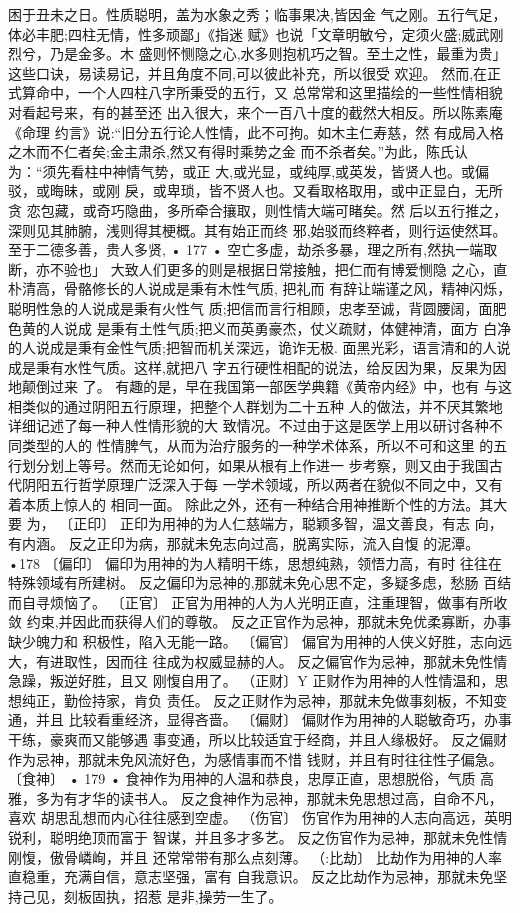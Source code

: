 困于丑未之日。性质聪明，盖为水象之秀；临事果决,皆因金
气之刚。五行气足，体必丰肥;四柱无情，性多顽鄙」《指迷
赋》也说「文章明敏兮，定须火盛;威武刚烈兮，乃是金多。木
盛则怀恻隐之心,水多则抱机巧之智。至土之性，最重为贵」
这些口诀，易读易记，并且角度不同,可以彼此补充，所以很受
欢迎。
然而,在正式算命中，一个人四柱八字所秉受的五行，又
总常常和这里描绘的一些性情相貌对看起号来，有的甚至还
出入很大，来个一百八十度的截然大相反。所以陈素庵《命理
约言》说:“旧分五行论人性情，此不可拘。如木主仁寿慈，然
有成局入格之木而不仁者矣;金主肃杀,然又有得时乘势之金
而不杀者矣。”为此，陈氏认为：“须先看柱中神情气势，或正
大,或光显，或纯厚,或英发，皆贤人也。或偏驳，或晦昧，或刚
戾，或卑琐，皆不贤人也。又看取格取用，或中正显白，无所贪
恋包藏，或奇巧隐曲，多所牵合攘取，则性情大端可睹矣。然
后以五行推之，深则见其肺腑，浅则得其梗概。其有始正而终
邪,始驳而终粹者，则行运使然耳。至于二德多善，贵人多贤,
• 177 •
空亡多虚，劫杀多暴，理之所有,然执一端取断，亦不验也」
大致人们更多的则是根据日常接触，把仁而有博爱恻隐
之心，直朴清高，骨骼修长的人说成是秉有木性气质, 把礼而
有辞让端谨之风，精神闪烁，聪明性急的人说成是秉有火性气
质;把信而言行相顾，忠孝至诚，背圆腰阔，面肥色黄的人说成
是秉有土性气质;把义而英勇豪杰，仗义疏财，体健神清，面方
白净的人说成是秉有金性气质;把智而机关深远，诡诈无极.
面黑光彩，语言清和的人说成是秉有水性气质。这样,就把八
字五行硬性相配的说法，给反因为果，反果为因地颠倒过来
了。
有趣的是，早在我国第一部医学典籍《黄帝内经》中，也有
与这相类似的通过阴阳五行原理，把整个人群划为二十五种
人的做法，并不厌其繁地详细记述了每一种人性情形貌的大
致情况。不过由于这是医学上用以研讨各种不同类型的人的
性情脾气，从而为治疗服务的一种学术体系，所以不可和这里
的五行划分划上等号。然而无论如何，如果从根有上作进一
步考察，则又由于我国古代阴阳五行哲学原理广泛深入于每
一学术领域，所以两者在貌似不同之中，又有着本质上惊人的
相同一面。
除此之外，还有一种结合用神推断个性的方法。其大要
为，
〔正印〕
正印为用神的为人仁慈端方，聪颖多智，温文善良，有志
向，有内涵。
反之正印为病，那就未免志向过高，脱离实际，流入自愎
的泥潭。
•178
〔偏印〕
偏印为用神的为人精明干练，思想纯熟，领悟力高，有时
往往在特殊领域有所建树。
反之偏印为忌神的,那就未免心思不定，多疑多虑，愁肠
百结而自寻烦恼了。
〔正官〕
正官为用神的人为人光明正直，注重理智，做事有所收敛
约束,并因此而获得人们的尊敬。
反之正官作为忌神，那就未免优柔寡断，办事缺少魄力和
积极性，陷入无能一路。
〔偏官〕
偏官为用神的人侠义好胜，志向远大，有进取性，因而往
往成为权威显赫的人。
反之偏官作为忌神，那就未免性情急躁，叛逆好胜，且又
刚愎自用了。
（正财〕Y
正财作为用神的人性情温和，思想纯正，勤俭持家，肯负
责任。
反之正财作为忌神，那就未免做事刻板，不知变通，并且
比较看重经济，显得吝啬。
〔偏财〕
偏财作为用神的人聪敏奇巧，办事干练，豪爽而又能够遇
事变通，所以比较适宜于经商，并且人缘极好。
反之偏财作为忌神，那就未免风流好色，为感情事而不惜
钱财，并且有时往往性子偏急。
〔食神〕
• 179 •
食神作为用神的人温和恭良，忠厚正直，思想脱俗，气质
高雅，多为有才华的读书人。
反之食神作为忌神，那就未免思想过高，自命不凡，喜欢
胡思乱想而内心往往感到空虚。
（伤官〕
伤官作为用神的人志向高远，英明锐利，聪明绝顶而富于
智谋，并且多才多艺。
反之伤官作为忌神，那就未免性情刚愎，傲骨嶙峋，并且
还常常带有那么点刻薄。
（:比劫〕
比劫作为用神的人率直稳重，充满自信，意志坚强，富有
自我意识。
反之比劫作为忌神，那就未免坚持己见，刻板固执，招惹
是非,操劳一生了。

